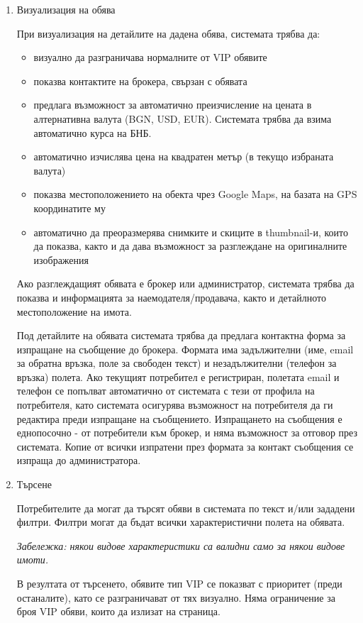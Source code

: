 \documentclass[]{article}
\begin{document}
\begin{enumerate}[I.]
{\begin{enumerate}[1.]
			\item {Визуализация на обява

				При визуализация на детайлите на дадена обява, системата трябва да:
				\begin{itemize}
					\item визуално да разграничава нормалните от VIP обявите
					\item показва контактите на брокера, свързан с обявата
					\item предлага възможност за автоматично преизчисление на цената в алтернативна валута (BGN, USD, EUR).				Системата трябва да взима автоматично курса на БНБ.
					\item автоматично изчислява цена на квадратен метър (в текущо избраната валута)
					\item показва местоположението на обекта чрез Google Maps, на базата на GPS координатите му
					\item автоматично да преоразмерява снимките и скиците в thumbnail-и, които да показва, както и да дава възможност за разглеждане на оригиналните изображения			
				\end{itemize}
				
				Ако разглеждащият обявата е брокер или администратор, системата трябва да показва и информацията за наемодателя/продавача, както и детайлното местоположение на имота.
				
				Под детайлите на обявата системата трябва да предлага контактна форма за изпращане на съобщение до брокера. Формата има задължителни (име, email за обратна връзка, поле за свободен текст) и незадължителни (телефон за връзка) полета. Ако текущият потребител е регистриран, полетата email и телефон се попълват автоматично от системата с тези от профила на потребителя, като системата осигурява възможност на потребителя да ги редактира преди изпращане на съобщението. Изпращането на съобщения е еднопосочно - от потребители към брокер, и няма възможност за отговор през системата. Копие от всички изпратени през формата за контакт съобщения се изпраща до администратора.
			}

			\item {Търсене
			
				Потребителите да могат да търсят обяви в системата по текст и/или зададени филтри. Филтри могат да бъдат всички характеристични полета на обявата. 
				
				\emph{Забележка: някои видове характеристики са валидни само за някои видове имоти.}

				В резултата от търсенето, обявите тип VIP се показват с приоритет (преди останалите), като се разграничават от тях визуално. Няма ограничение за броя VIP обяви, които да излизат на страница.
			}
			

\end{enumerate}}
\end{enumerate}
\end{document}
